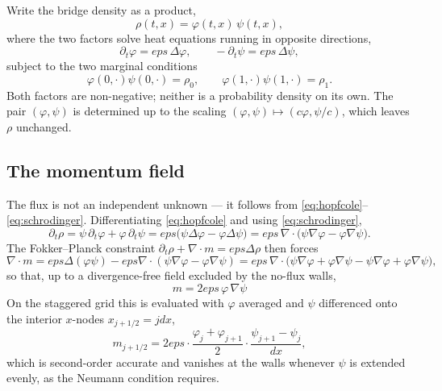 \documentclass[11pt]{article}
\newcommand{\eps}{\varepsilon}
\newcommand{\dt}{\Delta t}
\newcommand{\dx}{\Delta x}
\newcommand{\code}[1]{\texttt{#1}}
\def\eps{eps}\def\dt{dt}\def\dx{dx}\def\code#1{#1}%
\begin{document}
Write the bridge density as a product,
\begin{equation}
  \rho(t,x) = \varphi(t,x)\,\psi(t,x),
  \label{eq:hopfcole}
\end{equation}
where the two factors solve heat equations running in opposite directions,
\begin{equation}
  \partial_t\varphi = \eps\,\Delta\varphi,
  \qquad
  -\partial_t\psi = \eps\,\Delta\psi,
  \label{eq:schrodinger}
\end{equation}
subject to the two marginal conditions
\begin{equation}
  \varphi(0,\cdot)\psi(0,\cdot) = \rho_0,
  \qquad
  \varphi(1,\cdot)\psi(1,\cdot) = \rho_1 .
  \label{eq:marginals}
\end{equation}
Both factors are non-negative; neither is a probability density on its own.
The pair $(\varphi,\psi)$ is determined up to the scaling
$(\varphi,\psi)\mapsto(c\varphi,\psi/c)$, which leaves $\rho$ unchanged.

\subsection{The momentum field}

The flux is not an independent unknown --- it follows from
\eqref{eq:hopfcole}--\eqref{eq:schrodinger}. Differentiating
\eqref{eq:hopfcole} and using \eqref{eq:schrodinger},
\begin{equation}
  \partial_t\rho
  = \psi\,\partial_t\varphi + \varphi\,\partial_t\psi
  = \eps\bigl(\psi\Delta\varphi - \varphi\Delta\psi\bigr)
  = \eps\,\nabla\!\cdot\!\bigl(\psi\nabla\varphi - \varphi\nabla\psi\bigr).
\end{equation}
The Fokker--Planck constraint $\partial_t\rho + \nabla\!\cdot\!m
= \eps\Delta\rho$ then forces
\begin{equation}
  \nabla\!\cdot\!m
  = \eps\Delta(\varphi\psi) - \eps\nabla\!\cdot\!(\psi\nabla\varphi - \varphi\nabla\psi)
  = \eps\,\nabla\!\cdot\!\bigl(\psi\nabla\varphi + \varphi\nabla\psi
      - \psi\nabla\varphi + \varphi\nabla\psi\bigr),
\end{equation}
so that, up to a divergence-free field excluded by the no-flux walls,
\begin{equation}
  \boxed{\;m = 2\eps\,\varphi\,\nabla\psi\;}
  \label{eq:momentum}
\end{equation}
On the staggered grid this is evaluated with $\varphi$ averaged and $\psi$
differenced onto the interior $x$-nodes $x_{j+1/2}=j\dx$,
\begin{equation}
  m_{j+1/2}
  = 2\eps\cdot\frac{\varphi_j+\varphi_{j+1}}{2}
           \cdot\frac{\psi_{j+1}-\psi_j}{\dx},
  \label{eq:momentumdisc}
\end{equation}
which is second-order accurate and vanishes at the walls whenever $\psi$ is
extended evenly, as the Neumann condition requires.
\end{document}
